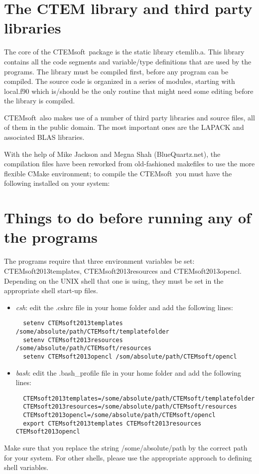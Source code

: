 \documentclass[DIV=calc, paper=letter, fontsize=11pt]{scrartcl}	 %
\newcommand{\ctp}{\textsf{CTEMsoft}}
\begin{document}
\newpage
\section{The CTEM library and third party libraries\label{sec:library}}
The core of the \ctp\ package is the static library \textsf{ctemlib.a}.  This library contains all the code segments and variable/type definitions
that are used by the programs.  The library must be compiled first, before any program can be compiled.  The source code is organized 
in a series of modules, starting with \textsf{local.f90} which is/should be the only routine that might need some editing before the library is 
compiled.  

\ctp\ also makes use of a number of third party libraries and source files, all of them in the public domain.  The most important ones are 
the LAPACK and associated BLAS libraries. 

With the help of Mike Jackson and Megna Shah (BlueQuartz.net), the compilation files have been reworked from old-fashioned
makefiles to use the more flexible CMake environment; to compile the \ctp\ you must have the following installed on your system:




\newpage
\section{Things to do before running any of the programs\label{sec:todo}}
The programs require that three environment variables be set: \textsf{CTEMsoft2013templates},
\textsf{CTEMsoft2013resources} and \textsf{CTEMsoft2013opencl}.  Depending on the UNIX shell that one is using, they must be set in
the appropriate shell start-up files.

\begin{itemize}
\item \textit{csh}: edit the \textsf{.cshrc} file in your home folder and add the following lines:
\begin{verbatim}
  setenv CTEMsoft2013templates /some/absolute/path/CTEMsoft/templatefolder
  setenv CTEMsoft2013resources /some/absolute/path/CTEMsoft/resources
  setenv CTEMsoft2013opencl /som/absolute/path/CTEMsoft/opencl
\end{verbatim}
\item \textit{bash}: edit the \textsf{.bash\_profile} file in your home folder and add the following lines:
\begin{verbatim}
  CTEMsoft2013templates=/some/absolute/path/CTEMsoft/templatefolder
  CTEMsoft2013resources=/some/absolute/path/CTEMsoft/resources
  CTEMsoft2013opencl=/some/absolute/path/CTEMsoft/opencl
  export CTEMsoft2013templates CTEMsoft2013resources CTEMsoft2013opencl
\end{verbatim}
\end{itemize}
Make sure that you replace the string \textsf{/some/absolute/path} by the correct path for your system.
For other shells, please use the appropriate approach to defining shell variables.
\end{document}
